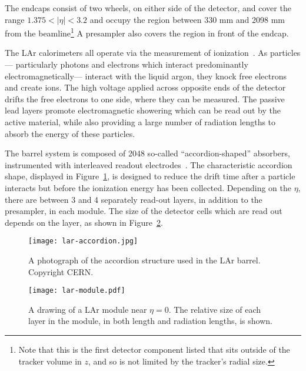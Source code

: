 The endcaps consist of two wheels, on either side of the detector, and cover the range $1.375 < |\eta| < 3.2$ and occupy the region between 330 mm and 2098 mm from the beamline\footnote{Note that this is the first detector component listed that sits outside of the tracker volume in $z$, and so is not limited by the tracker's radial size.} A presampler also covers the region in front of the endcap.

The LAr calorimeters all operate via the measurement of ionization~\cite{Detectors,Wigmans}. As particles--- particularly photons and electrons which interact predominantly electromagnetically--- interact with the liquid argon, they knock free electrons and create ions. The high voltage applied across opposite ends of the detector drifts the free electrons to one side, where they can be measured. The passive lead layers promote electromagnetic showering which can be read out by the active material, while also providing a large number of radiation lengths to absorb the energy of these particles.

The barrel system is composed of 2048 so-called ``accordion-shaped'' absorbers, instrumented with interleaved readout electrodes~\cite{ATLASPaper}. The characteristic accordion shape, displayed in Figure~\ref{fig:detector:lar-accordion}, is designed to reduce the drift time after a particle interacts but before the ionization energy has been collected. Depending on the $\eta$, there are between 3 and 4 separately read-out layers, in addition to the presampler, in each module. The size of the detector cells which are read out depends on the layer, as shown in Figure~\ref{fig:detector:lar-module}. 


\begin{figure}
\centering
\texttt{[image: lar-accordion.jpg]}
\label{fig:detector:lar-accordion}
\caption{A photograph of the accordion structure used in the LAr barrel. Copyright CERN.}
\end{figure}



\begin{figure}
\centering
\texttt{[image: lar-module.pdf]}
\label{fig:detector:lar-module}
\caption{A drawing of a LAr module near $\eta = 0$. The relative size of each layer in the module, in both length and radiation lengths, is shown.}
\end{figure}

